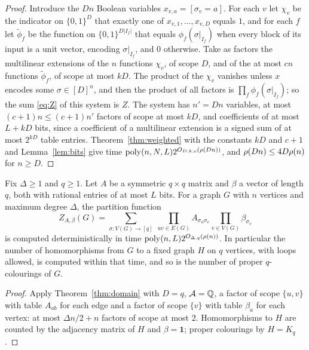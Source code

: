 \begin{proof}
Introduce the $Dn$ Boolean variables $x_{v,a}=[\sigma_v=a]$. For each $v$ let
$\chi_v$ be the indicator on $\{0,1\}^{D}$ that exactly one of
$x_{v,1},\dots,x_{v,D}$ equals $1$, and for each $f$ let $\tilde\phi_f$ be the
function on $\{0,1\}^{D|I_f|}$ that equals $\phi_f(\sigma|_{I_f})$ when every
block of its input is a unit vector, encoding $\sigma|_{I_f}$, and $0$
otherwise. Take as factors the multilinear extensions of the $n$ functions
$\chi_v$, of scope $D$, and of the at most $cn$ functions $\tilde\phi_f$, of
scope at most $kD$. The product of the $\chi_v$ vanishes unless $x$ encodes some
$\sigma\in[D]^n$, and then the product of all factors is
$\prod_f\phi_f(\sigma|_{I_f})$; so the sum \eqref{eq:Z} of this system is $Z$.
The system has $n'=Dn$ variables, at most $(c+1)n\le(c+1)n'$ factors of scope
at most $kD$, and coefficients of at most $L+kD$ bits, since a coefficient of
a multilinear extension is a signed sum of at most $2^{kD}$ table entries.
Theorem~\ref{thm:weighted} with the constants $kD$ and $c+1$ and
Lemma~\ref{lem:bits} give time $\operatorname{poly}(n,N,L)2^{O_{D,k,c}(\rho(Dn))}$, and
$\rho(Dn)\le4D\rho(n)$ for $n\ge D$.
\end{proof}

\begin{corollary}\label{cor:hom}
Fix $\Delta\ge1$ and $q\ge1$. Let $A$ be a symmetric $q\times q$ matrix and
$\beta$ a vector of length $q$, both with rational entries of at most $L$ bits.
For a graph $G$ with $n$ vertices and maximum degree $\Delta$, the partition
function
\[
  Z_{A,\beta}(G)=\sum_{\sigma:V(G)\to[q]}\ \prod_{uv\in E(G)}A_{\sigma_u\sigma_v}\prod_{v\in V(G)}\beta_{\sigma_v}
\]
is computed deterministically in time $\operatorname{poly}(n,L)2^{O_{\Delta,q}(\rho(n))}$. In
particular the number of homomorphisms from $G$ to a fixed graph $H$ on $q$
vertices, with loops allowed, is computed within that time, and so is the
number of proper $q$-colourings of $G$.
\end{corollary}

\begin{proof}
Apply Theorem~\ref{thm:domain} with $D=q$, $\mathcal{A}=\mathbb{Q}$, a factor of scope $\{u,v\}$
with table $A_{ab}$ for each edge and a factor of scope $\{v\}$ with table
$\beta_a$ for each vertex: at most $\Delta n/2+n$ factors of scope at most
$2$. Homomorphisms to $H$ are counted by the adjacency matrix of $H$ and
$\beta=\mathbf 1$; proper colourings by $H=K_q$.
\end{proof}

